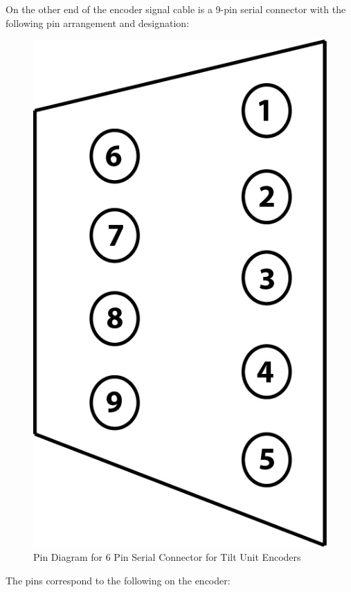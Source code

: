 \newpage

\noindent On the other end of the encoder signal cable is a 9-pin serial connector with the following pin arrangement and designation:

\begin{figure}[H]
\centering
\includegraphics[scale=.3]{Photos/Encoder_9PinSerialPinDiagram.jpg}
\caption{\label{fig:6pinserial} Pin Diagram for 6 Pin Serial Connector for Tilt Unit Encoders}
\end{figure}

\noindent The pins correspond to the following on the encoder:

